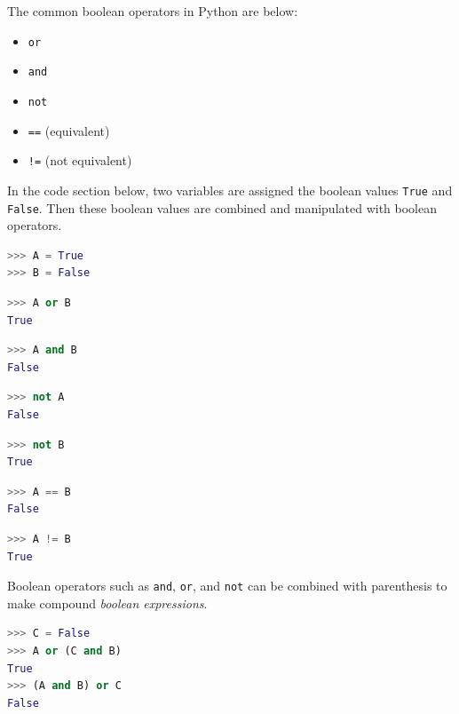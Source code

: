 \documentclass{book}
\providecommand{\tightlist}{%
      \setlength{\itemsep}{0pt}\setlength{\parskip}{0pt}}
\begin{document}
The common boolean operators in Python are below:

\begin{itemize}
\tightlist
\item
  \lstinline!or!
\item
  \lstinline!and!
\item
  \lstinline!not!
\item
  \lstinline!==! (equivalent)
\item
  \lstinline"!=" (not equivalent)
\end{itemize}

In the code section below, two variables are assigned the boolean values
\lstinline!True! and \lstinline!False!. Then these boolean values are
combined and manipulated with boolean operators.

\begin{lstlisting}[language=Python]
>>> A = True
>>> B = False
\end{lstlisting}

\begin{lstlisting}[language=Python]
>>> A or B
True
\end{lstlisting}

\begin{lstlisting}[language=Python]
>>> A and B
False
\end{lstlisting}

\begin{lstlisting}[language=Python]
>>> not A
False
\end{lstlisting}

\begin{lstlisting}[language=Python]
>>> not B
True
\end{lstlisting}

\begin{lstlisting}[language=Python]
>>> A == B
False
\end{lstlisting}

\begin{lstlisting}[language=Python]
>>> A != B
True
\end{lstlisting}

Boolean operators such as \lstinline!and!, \lstinline!or!, and
\lstinline!not! can be combined with parenthesis to make compound
\emph{boolean expressions}.

\begin{lstlisting}[language=Python]
>>> C = False
>>> A or (C and B)
True
>>> (A and B) or C
False
\end{lstlisting}
    
\end{document}
